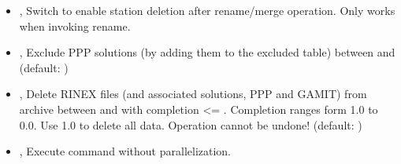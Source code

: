 \documentclass[letterpaper,10pt,english]{sphinxmanual}
\begin{document}
\begin{itemize}
\item {} 
\sphinxAtStartPar
{\hyperref[\detokenize{pgamit.com:IntegrityCheck.py--del_stn}]{}}, {\hyperref[\detokenize{pgamit.com:IntegrityCheck.py---delete_station}]{}} \sphinxhyphen{} Switch to enable station deletion after rename/merge operation. Only works when invoking \textendash{}rename.

\item {} 
\sphinxAtStartPar
{\hyperref[\detokenize{pgamit.com:IntegrityCheck.py--es}]{}} , {\hyperref[\detokenize{pgamit.com:IntegrityCheck.py---exclude_solutions}]{}}  \sphinxhyphen{} Exclude PPP solutions (by adding them to the excluded table) between  and  (default: )

\item {} 
\sphinxAtStartPar
{\hyperref[\detokenize{pgamit.com:IntegrityCheck.py--del}]{}} , {\hyperref[\detokenize{pgamit.com:IntegrityCheck.py---delete_rinex}]{}}  \sphinxhyphen{} Delete RINEX files (and associated solutions, PPP and GAMIT) from archive between  and  with completion \textless{}= . Completion ranges form 1.0 to 0.0. Use 1.0 to delete all data. Operation cannot be undone! (default: )

\item {} 
\sphinxAtStartPar
{\hyperref[\detokenize{pgamit.com:IntegrityCheck.py--np}]{}}, {\hyperref[\detokenize{pgamit.com:IntegrityCheck.py---noparallel}]{}} \sphinxhyphen{} Execute command without parallelization.

\end{itemize}
\end{document}
